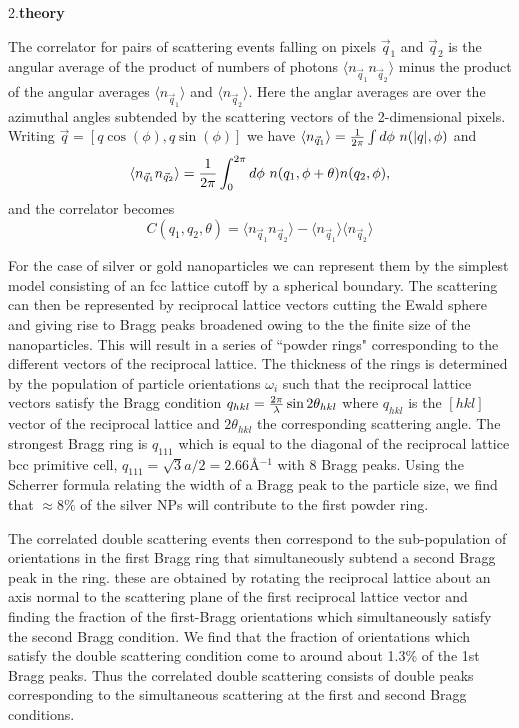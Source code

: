 \documentclass [11pt,fleqn]{article}
\def \be {\begin{equation}}
\def \ee {\end{equation}}
\begin{document}
2.{\bf theory}

The correlator for pairs of scattering events falling on pixels $\vec{q}_1$ and $\vec{q}_2$ is the angular average of the product of numbers of photons $\langle n_{\vec{q}_1}n_{\vec{q}_2}\rangle$ minus the product of the angular averages $\langle n_{\vec{q}_1}\rangle$ and $\langle n_{\vec{q}_2}\rangle$.
Here the anglar averages are over the azimuthal angles subtended by the scattering vectors of the 2-dimensional pixels. Writing $\vec{q}=[q\cos(\phi),q\sin(\phi)]$ we have 
$\langle n_{\vec{q}_1}\rangle={1\over 2\pi}\int d\phi\ n(|q|,\phi) $ and
\be
\langle n_{\vec{q}_1}n_{\vec{q}_2}\rangle={1\over 2\pi}\int_0^{2\pi} d\phi\ n(q_1,\phi+\theta)n(q_2,\phi),
\ee
and the correlator becomes 
\be
C(q_1,q_2,\theta)=\langle n_{\vec{q}_1}n_{\vec{q}_2}\rangle-\langle n_{\vec{q}_1}\rangle \langle n_{\vec{q}_2}\rangle
\ee

For the case of silver or gold  nanoparticles we can represent them by the simplest model consisting of an fcc lattice cutoff by a spherical boundary. The scattering can then be represented by reciprocal lattice vectors cutting the Ewald sphere and giving rise to Bragg peaks broadened owing to the  the finite size of the nanoparticles.  This will result in a series of ``powder rings" corresponding to the different vectors of the reciprocal lattice. The thickness of the rings is determined by the population of particle orientations $\omega_i$ such that the reciprocal lattice vectors  satisfy the Bragg condition $q_{hkl}={2\pi\over\lambda}\sin 2\theta_{hkl}$ where $q_{hkl}$ is the $[hkl]$ vector of the reciprocal lattice and  $2\theta_{hkl}$ the corresponding scattering angle. The
strongest Bragg ring is $q_{111}$ which is equal to the diagonal of the reciprocal lattice bcc primitive cell, 
$q_{111}=\sqrt{3}a/2=2.66$\AA$^{-1}$ with 8 Bragg peaks. Using the Scherrer formula relating the width of a Bragg peak to the particle size, we find that $\approx 8\%$ of the silver NPs will contribute to the first powder ring. 

The correlated double scattering events then correspond to the sub-population of orientations in the first Bragg ring that simultaneously subtend a second Bragg peak in the ring. these are obtained by rotating the 
reciprocal lattice about an axis normal to the scattering plane of the first reciprocal lattice vector and finding the fraction of the first-Bragg orientations which simultaneously satisfy the second Bragg condition. 
We find that the fraction of orientations which satisfy the double scattering condition come to around about 1.3\% of the 1st Bragg peaks. Thus the correlated double scattering consists of double peaks corresponding to the simultaneous scattering at the first and second Bragg conditions.
\end{document}
